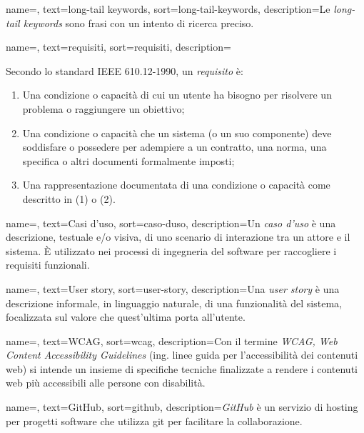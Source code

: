  {
    name=,
    text=long-tail keywords,
    sort=long-tail-keywords,
    description={Le \emph{long-tail keywords} sono frasi con un intento di ricerca preciso.}
}

 {
    name=,
    text=requisiti,
    sort=requisiti,
    description={Secondo lo standard IEEE 610.12-1990, un \emph{requisito} è:
    \begin{enumerate}
        \item Una condizione o capacità di cui un utente ha bisogno per risolvere un problema o raggiungere un obiettivo;
        \item Una condizione o capacità che un sistema (o un suo componente) deve soddisfare o possedere per adempiere a un contratto, una norma, una specifica o altri documenti formalmente imposti;
        \item Una rappresentazione documentata di una condizione o capacità come descritto in (1) o (2).
    \end{enumerate}
    }
}

 {
    name=,
    text=Casi d'uso,
    sort=caso-duso,
    description={Un \emph{caso d'uso} è una descrizione, testuale e/o visiva, di uno scenario di interazione tra un attore e il sistema. È utilizzato nei processi di ingegneria del software per raccogliere i requisiti funzionali.}
}

 {
    name=,
    text=User story,
    sort=user-story,
    description={Una \emph{user story} è una descrizione informale, in linguaggio naturale, di una funzionalità del sistema, focalizzata sul valore che quest'ultima porta all'utente.}
}

 {
    name=,
    text=WCAG,
    sort=wcag,
    description={Con il termine \emph{WCAG, Web Content Accessibility Guidelines} (ing. linee guida per l'accessibilità dei contenuti web) si intende un insieme di specifiche tecniche finalizzate a rendere i contenuti web più accessibili alle persone con disabilità.}
}

 {
    name=,
    text=GitHub,
    sort=github,
    description={\emph{GitHub} è un servizio di hosting per progetti software che utilizza \gls{git} per facilitare la collaborazione.}
}


